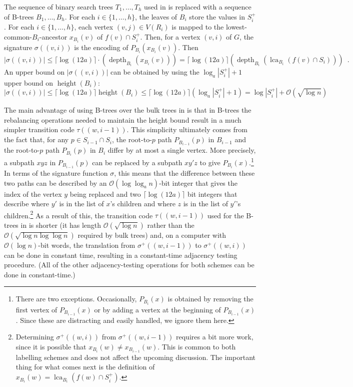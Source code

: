 \documentclass{patmorin}
\renewcommand{\le}{\leqslant}
\DeclareMathOperator{\height}{height}
\DeclareMathOperator{\depth}{depth}
\DeclareMathOperator{\lca}{lca}
\newcommand{\Oh}{\calO}
\newcommand{\calO}{\mathcal{O}}
\begin{document}
  The sequence of binary search trees $T_1,\ldots,T_h$ used in \cite{gawrychowski.janczewski:simpler} is replaced with a sequence of B-trees $B_1,\ldots,B_h$.
  For each $i\in\{1,\ldots,h\}$, the leaves of $B_i$ store the values in $S^+_i$.
  For each $i\in\{1,\ldots,h\}$, each vertex $(v,j)\in V(R_i)$ is mapped to the lowest-common-$B_i$-ancestor $x_{B_i}(v)$ of $f(v)\cap S^+_i$.
  Then, for a vertex $(v,i)$ of $G$, the signature $\sigma((v,i))$ is the encoding of $P_{B_i}(x_{B_i}(v))$.
  Then
  \[
    |\sigma((v,i))| \le \lceil\log (12a)\rceil\cdot(\depth_{B_i}(x_{B_i}(v))) = \lceil\log (12a)\rceil(\depth_{B_i}(\lca_{B_i}(f(v)\cap S_i))) \enspace .
  \]
  An upper bound on $|\sigma((v,i))|$ can be obtained by using the $\log_a |S^+_i|+1$ upper bound on $\height(B_i)$:
  \[
    |\sigma((v,i))|\le \lceil\log (12a)\rceil\height(B_i) \le \lceil\log (12a)\rceil(\log_a |S^+_i| + 1)= \log |S^+_i| + \Oh(\sqrt{\log n})
  \]

  The main advantage of using B-trees over the bulk trees in \cite{dujmovic.esperet.ea:adjacency} is that in B-trees the rebalancing operations needed to maintain the height bound result in a much simpler transition code $\tau((w,i-1))$.
  This simplicity ultimately comes from the fact that, for any $p\in S_{i-1}\cap S_i$, the root-to-$p$ path $P_{B_{i-1}}(p)$ in $B_{i-1}$ and the root-to-$p$ path $P_{B_i}(p)$ in $B_i$ differ by at most a single vertex.
  More precisely, a subpath $xyz$ in $P_{B_{i-1}}(p)$ can be replaced by a subpath $xy'z$ to give $P_{B_i}(x)$.\footnote{There are two exceptions.
  Occasionally, $P_{B_i}(x)$ is obtained by removing the first vertex of $P_{B_{i-1}}(x)$ or by adding a vertex at the beginning of $P_{B_{i-1}}(x)$.
  Since these are distracting and easily handled, we ignore them here.}  In terms of the signature function $\sigma$, this means that the difference between these two paths can be described by an $\Oh(\log\log_a n)$-bit integer that gives the index of the vertex $y$ being replaced and two $\lceil\log (12a)\rceil$ bit integers that describe where $y'$ is in the list of $x$'s children and where $z$ is in the list of $y'$'s children.\footnote{Determining $\sigma^+((w,i))$ from $\sigma^+((w,i-1))$ requires a bit more work, since it is possible that $x_{B_i}(w)\neq x_{B_{i-1}}(w)$.
  This is common to both labelling schemes and does not affect the upcoming discussion.
  The important thing for what comes next is the definition of $x_{B_i}(w)=\lca_{B_i}(f(w)\cap S^+_i)$.}  As a result of this, the transition code $\tau((w,i-1))$ used for the B-trees in \cite{gawrychowski.janczewski:simpler} is shorter (it has length $\Oh(\sqrt{\log n})$ rather than the $\Oh(\sqrt{\log n\log\log n})$ required by bulk trees) and, on a computer with $\Oh(\log n)$-bit words, the translation from $\sigma^+((w,i-1))$ to $\sigma^+((w,i))$ can be done in constant time, resulting in a constant-time adjacency testing procedure.
  (All of the other adjacency-testing operations for both schemes can be done in constant-time.)
\end{document}
